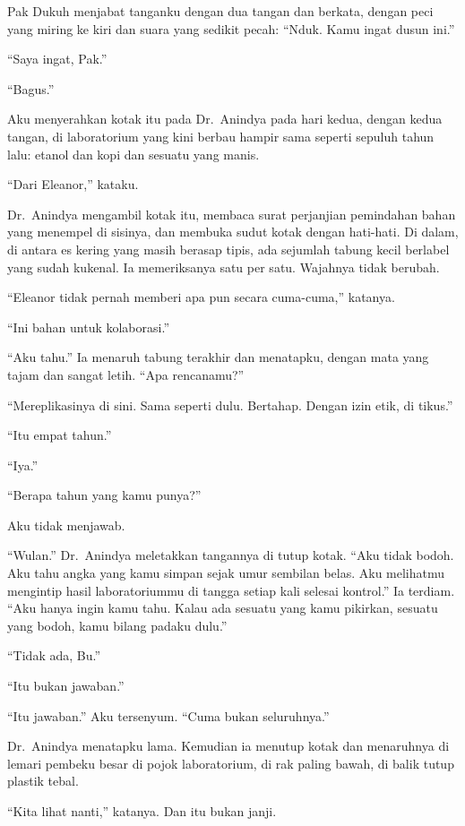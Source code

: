 \documentclass[11pt,twoside,openany]{book}
\makeatletter
\newcommand{\scenebreak}{\par\vspace{0.9em}{\centering\textsc{*\hspace{0.7em}*\hspace{0.7em}*}\par}\vspace{0.9em}\@afterindentfalse\@afterheading}
\makeatother
\begin{document}
Pak Dukuh menjabat tanganku dengan dua tangan dan berkata, dengan peci yang miring ke kiri dan suara yang sedikit pecah: ``Nduk. Kamu ingat dusun ini.''

``Saya ingat, Pak.''

``Bagus.''

\scenebreak
Aku menyerahkan kotak itu pada Dr.~Anindya pada hari kedua, dengan kedua tangan, di laboratorium yang kini berbau hampir sama seperti sepuluh tahun lalu: etanol dan kopi dan sesuatu yang manis.

``Dari Eleanor,'' kataku.

Dr.~Anindya mengambil kotak itu, membaca surat perjanjian pemindahan bahan yang menempel di sisinya, dan membuka sudut kotak dengan hati-hati. Di dalam, di antara es kering yang masih berasap tipis, ada sejumlah tabung kecil berlabel yang sudah kukenal. Ia memeriksanya satu per satu. Wajahnya tidak berubah.

``Eleanor tidak pernah memberi apa pun secara cuma-cuma,'' katanya.

``Ini bahan untuk kolaborasi.''

``Aku tahu.'' Ia menaruh tabung terakhir dan menatapku, dengan mata yang tajam dan sangat letih. ``Apa rencanamu?''

``Mereplikasinya di sini. Sama seperti dulu. Bertahap. Dengan izin etik, di tikus.''

``Itu empat tahun.''

``Iya.''

``Berapa tahun yang kamu punya?''

Aku tidak menjawab.

``Wulan.'' Dr.~Anindya meletakkan tangannya di tutup kotak. ``Aku tidak bodoh. Aku tahu angka yang kamu simpan sejak umur sembilan belas. Aku melihatmu mengintip hasil laboratoriummu di tangga setiap kali selesai kontrol.'' Ia terdiam. ``Aku hanya ingin kamu tahu. Kalau ada sesuatu yang kamu pikirkan, sesuatu yang bodoh, kamu bilang padaku dulu.''

``Tidak ada, Bu.''

``Itu bukan jawaban.''

``Itu jawaban.'' Aku tersenyum. ``Cuma bukan seluruhnya.''

Dr.~Anindya menatapku lama. Kemudian ia menutup kotak dan menaruhnya di lemari pembeku besar di pojok laboratorium, di rak paling bawah, di balik tutup plastik tebal.

``Kita lihat nanti,'' katanya. Dan itu bukan janji.
\end{document}

